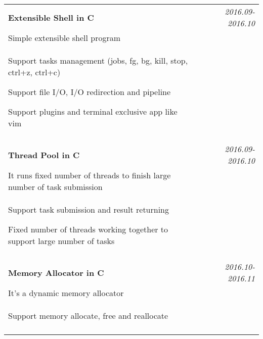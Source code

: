 \documentclass[a4paper,10pt]{article}
\begin{document}
\begin{tabular}{p{13.5cm}p{0.5cm}r}
\textbf{Extensible Shell in C} && \emph{2016.09-2016.10} \\
\hspace{1em} Simple extensible shell program && \vspace{-0.5em} \\
\begin{compactitem}
  \item Support tasks management (jobs, fg, bg, kill, stop, ctrl+z, ctrl+c) \vspace{0.2em}
  \item Support file I/O, I/O redirection and pipeline \vspace{0.2em}
  \item Support plugins and terminal exclusive app like vim \vspace{0.2em}  
\end{compactitem}&&\vspace{-2.2em} \\
\multicolumn{3}{c}{} \\


\textbf{Thread Pool in C} && \emph{2016.09-2016.10} \\
\hspace{1em} It runs fixed number of threads to finish large number of task submission && \vspace{-0.5em} \\
\begin{compactitem}
  \item Support task submission and result returning\vspace{0.2em}
  \item Fixed number of threads working together to support large number of tasks
\end{compactitem}&&\vspace{-2.2em} \\
\multicolumn{3}{c}{} \\


\textbf{Memory Allocator in C} && \emph{2016.10-2016.11} \\
\hspace{1em} It's a dynamic memory allocator && \vspace{-0.5em} \\
\begin{compactitem}
  \item Support memory allocate, free and reallocate \vspace{0.2em}
\end{compactitem}&&\vspace{-2.2em} \\
\multicolumn{3}{c}{} \\



\end{tabular}
\end{document}
